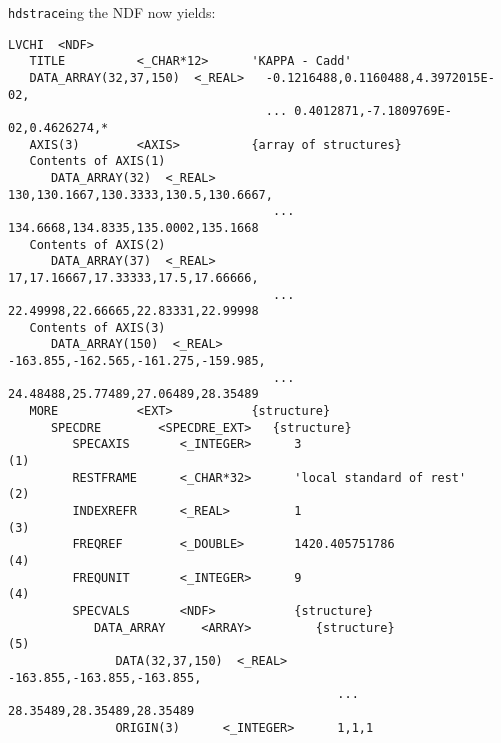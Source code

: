 {\tt hdstrace}ing the NDF now yields:

\small
\begin{verbatim}
LVCHI  <NDF>
   TITLE          <_CHAR*12>      'KAPPA - Cadd'
   DATA_ARRAY(32,37,150)  <_REAL>   -0.1216488,0.1160488,4.3972015E-02,
                                    ... 0.4012871,-7.1809769E-02,0.4626274,*
   AXIS(3)        <AXIS>          {array of structures}
   Contents of AXIS(1)
      DATA_ARRAY(32)  <_REAL>        130,130.1667,130.3333,130.5,130.6667,
                                     ... 134.6668,134.8335,135.0002,135.1668
   Contents of AXIS(2)
      DATA_ARRAY(37)  <_REAL>        17,17.16667,17.33333,17.5,17.66666,
                                     ... 22.49998,22.66665,22.83331,22.99998
   Contents of AXIS(3)
      DATA_ARRAY(150)  <_REAL>       -163.855,-162.565,-161.275,-159.985,
                                     ... 24.48488,25.77489,27.06489,28.35489
   MORE           <EXT>           {structure}
      SPECDRE        <SPECDRE_EXT>   {structure}
         SPECAXIS       <_INTEGER>      3                                   (1)
         RESTFRAME      <_CHAR*32>      'local standard of rest'            (2)
         INDEXREFR      <_REAL>         1                                   (3)
         FREQREF        <_DOUBLE>       1420.405751786                      (4)
         FREQUNIT       <_INTEGER>      9                                   (4)
         SPECVALS       <NDF>           {structure}
            DATA_ARRAY     <ARRAY>         {structure}                      (5)
               DATA(32,37,150)  <_REAL>       -163.855,-163.855,-163.855,
                                              ... 28.35489,28.35489,28.35489
               ORIGIN(3)      <_INTEGER>      1,1,1


\end{verbatim}
